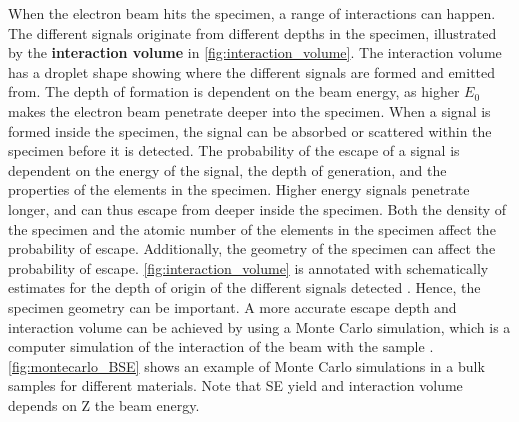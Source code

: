 When the electron beam hits the specimen, a range of interactions can happen. %
The different signals originate from different depths in the specimen, illustrated by the \textbf{interaction volume} in \cref{fig:interaction_volume}.
The interaction volume has a droplet shape showing where the different signals are formed and emitted from.
The depth of formation is dependent on the beam energy, as higher $E_0$ makes the electron beam penetrate deeper into the specimen.
When a signal is formed inside the specimen, the signal can be absorbed or scattered within the specimen before it is detected.
The probability of the escape of a signal is dependent on the energy of the signal, the depth of generation, and the properties of the elements in the specimen.
Higher energy signals penetrate longer, and can thus escape from deeper inside the specimen.
Both the density of the specimen and the atomic number of the elements in the specimen affect the probability of escape.
Additionally, the geometry of the specimen can affect the probability of escape.
\cref{fig:interaction_volume} is annotated with schematically estimates for the depth of origin of the different signals detected \cite{goldstein_scanning_2018,hollas_modern_2004}.
Hence, the specimen geometry can be important.
A more accurate escape depth and interaction volume can be achieved by using a Monte Carlo simulation, which is a computer simulation of the interaction of the beam with the sample \cite[Ch. 4.3.4]{goldstein_scanning_2018}.
\cref{fig:montecarlo_BSE} shows an example of Monte Carlo simulations in a bulk samples for different materials.
Note that SE yield and interaction volume depends on Z the beam energy.


